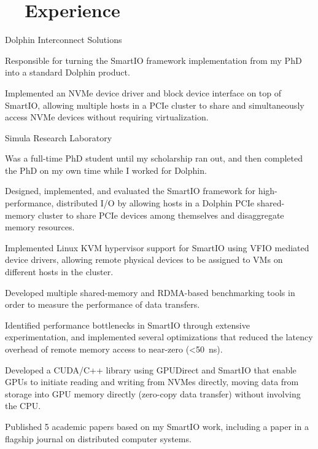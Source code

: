 \section[Experience]{\faBriefcase~~Experience}
\begin{experience}{Dolphin Interconnect Solutions}{
}
    \item{Responsible for turning the SmartIO framework implementation from my PhD into a standard Dolphin product.}
    \item{Implemented an NVMe device driver and block device interface on top of SmartIO, allowing multiple hosts in a PCIe cluster to share and simultaneously access NVMe devices without requiring virtualization.}
\end{experience}

\begin{experience}{Simula Research Laboratory}{
}
    \item{Was a full-time PhD student until my scholarship ran out, and then completed the PhD on my own time while I worked for Dolphin.}
    \item{Designed, implemented, and evaluated the SmartIO framework for high-performance, distributed I/O by allowing hosts in a Dolphin PCIe shared-memory cluster to share PCIe devices among themselves and disaggregate memory resources.}
    \item{Implemented Linux KVM hypervisor support for SmartIO using VFIO mediated device drivers, allowing remote physical devices to be assigned to VMs on different hosts in the cluster.}
    \item{Developed multiple shared-memory and RDMA-based benchmarking tools in order to measure the performance of data transfers.}
    \item{Identified performance bottlenecks in SmartIO through extensive experimentation, and implemented several optimizations that reduced the latency overhead of remote memory access to near-zero (\textless 50~ns).}
    \item{Developed a CUDA/C++ library using GPUDirect and SmartIO that enable  GPUs to initiate reading and writing from NVMes directly, moving data from storage into GPU memory directly (zero-copy data transfer) without involving the CPU.}
    \item{Published 5 academic papers based on my SmartIO work, including a paper in a flagship journal on distributed computer systems.}
\end{experience}

